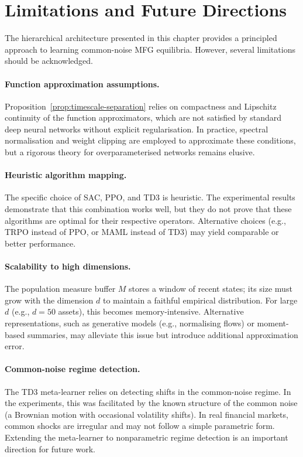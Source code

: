 \section{Limitations and Future Directions}
\label{sec:hrl-limitations}

The hierarchical architecture presented in this chapter provides a principled
approach to learning common-noise MFG equilibria. However, several limitations
should be acknowledged.

\paragraph{Function approximation assumptions.} Proposition~\ref{prop:timescale-separation}
relies on compactness and Lipschitz continuity of the function approximators, which
are not satisfied by standard deep neural networks without explicit regularisation.
In practice, spectral normalisation and weight clipping are employed to approximate
these conditions, but a rigorous theory for overparameterised networks remains
elusive.

\paragraph{Heuristic algorithm mapping.} The specific choice of SAC, PPO, and TD3 is
heuristic. The experimental results demonstrate that this combination works well,
but they do not prove that these algorithms are optimal for their respective
operators. Alternative choices (e.g., TRPO instead of PPO, or MAML instead of TD3)
may yield comparable or better performance.

\paragraph{Scalability to high dimensions.} The population measure buffer $M$ stores
a window of recent states; its size must grow with the dimension $d$ to maintain a
faithful empirical distribution. For large $d$ (e.g., $d=50$ assets), this becomes
memory-intensive. Alternative representations, such as generative models (e.g.,
normalising flows) or moment-based summaries, may alleviate this issue but introduce
additional approximation error.

\paragraph{Common-noise regime detection.} The TD3 meta-learner relies on detecting
shifts in the common-noise regime. In the experiments, this was facilitated by the
known structure of the common noise (a Brownian motion with occasional volatility
shifts). In real financial markets, common shocks are irregular and may not follow a
simple parametric form. Extending the meta-learner to nonparametric regime detection
is an important direction for future work.

